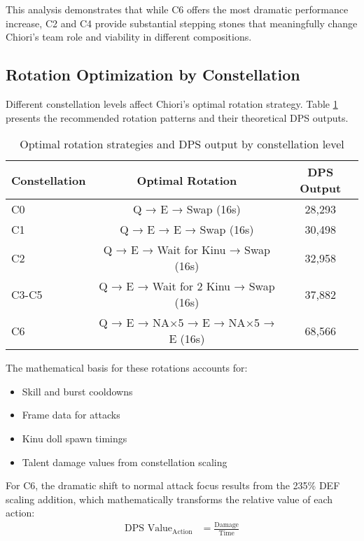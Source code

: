 \documentclass[12pt,a4paper]{article}
\begin{document}
This analysis demonstrates that while C6 offers the most dramatic performance increase, C2 and C4 provide substantial stepping stones that meaningfully change Chiori's team role and viability in different compositions.

\subsection{Rotation Optimization by Constellation}

Different constellation levels affect Chiori's optimal rotation strategy. Table \ref{tab:rotation_by_constellation} presents the recommended rotation patterns and their theoretical DPS outputs.

\begin{table}[h]
\centering
\begin{tabular}{lcc}
\toprule
\textbf{Constellation} & \textbf{Optimal Rotation} & \textbf{DPS Output} \\
\midrule
C0 & Q → E → Swap (16s) & 28,293 \\
C1 & Q → E → E → Swap (16s) & 30,498 \\
C2 & Q → E → Wait for Kinu → Swap (16s) & 32,958 \\
C3-C5 & Q → E → Wait for 2 Kinu → Swap (16s) & 37,882 \\
C6 & Q → E → NA×5 → E → NA×5 → E (16s) & 68,566 \\
\bottomrule
\end{tabular}
\caption{Optimal rotation strategies and DPS output by constellation level}
\label{tab:rotation_by_constellation}
\end{table}

The mathematical basis for these rotations accounts for:
\begin{itemize}
    \item Skill and burst cooldowns
    \item Frame data for attacks
    \item Kinu doll spawn timings
    \item Talent damage values from constellation scaling
\end{itemize}

For C6, the dramatic shift to normal attack focus results from the 235\% DEF scaling addition, which mathematically transforms the relative value of each action:
\begin{align}
\text{DPS Value}_{\text{Action}} &= \frac{\text{Damage}}{\text{Time}}
\end{align}
\end{document}
